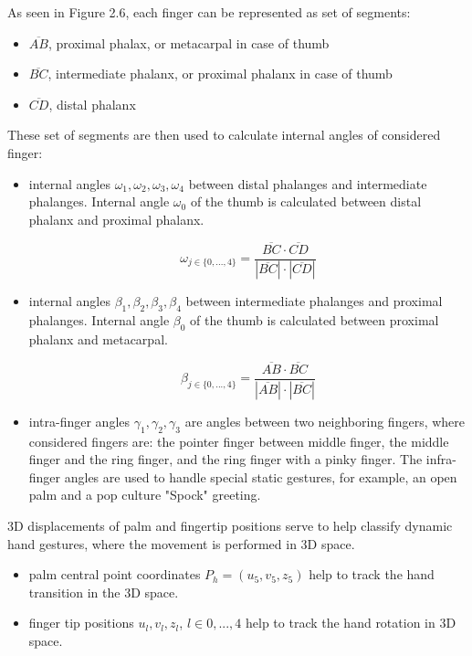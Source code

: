 As seen in Figure 2.6, each finger can be represented as set of segments:
\begin{itemize}
	\item $\overline{AB}$, proximal phalax, or metacarpal in case of thumb
	\item $\overline{BC}$, intermediate phalanx, or proximal phalanx in case of thumb
	\item $\overline{CD}$, distal phalanx
\end{itemize}

These set of segments are then used to calculate internal angles of considered finger:
\begin{itemize}
    \item internal angles $\omega_1, \omega_2, \omega_3, \omega_4$ between distal phalanges and intermediate phalanges. Internal angle $\omega_0$ of the thumb is calculated between distal phalanx and proximal phalanx.
	
	\begin{equation}
		{\omega_{j \in \{0, ..., 4\}} = \frac{\overline{BC} \cdot \overline{CD}}{|\overline{BC}| \cdot |\overline{CD}|}}
	\end{equation}

    \item internal angles $\beta_1, \beta_2, \beta_3, \beta_4$ between intermediate phalanges and proximal phalanges. Internal angle $\beta_0$ of the thumb is calculated between proximal phalanx and metacarpal.
	
	\begin{equation}
		{\beta_{j \in \{0, ..., 4\}} = \frac{\overline{AB} \cdot \overline{BC}}{|\overline{AB}| \cdot |\overline{BC}|}}
	\end{equation}
	
    \item intra-finger angles $\gamma_1, \gamma_2, \gamma_3$ are angles between two neighboring fingers, where considered fingers are: the pointer finger between middle finger, the middle finger and the ring finger, and the ring finger with a pinky finger. The infra-finger angles are used to handle special static gestures,  for example, an open palm and a pop culture "Spock" greeting.
\end{itemize}


3D displacements of palm and fingertip positions serve to help classify dynamic hand gestures, where the movement is performed in 3D space.


\begin{itemize}
	\item palm central point coordinates $P_h = (u_5, v_5, z_5)$ help to track the hand transition in the 3D space.
	\item finger tip positions $u_l, v_l, z_l$, $l \in {0, ..., 4}$ help to track the hand rotation in 3D space.
\end{itemize}

